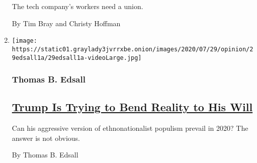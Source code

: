 \begin{enumerate}
  The tech company's workers need a union.

  By Tim Bray and Christy Hoffman
\item
  \texttt{[image: https://static01.graylady3jvrrxbe.onion/images/2020/07/29/opinion/29edsall1a/29edsall1a-videoLarge.jpg]}

  \hypertarget{thomas-b-edsall}{%
  \subsubsection{Thomas B. Edsall}\label{thomas-b-edsall}}

  \hypertarget{trump-is-trying-to-bend-reality-to-his-will}{%
  \subsection{\texorpdfstring{\href{/2020/07/29/opinion/trump-2020-populism.html}{Trump
  Is Trying to Bend Reality to His
  Will}}{Trump Is Trying to Bend Reality to His Will}}\label{trump-is-trying-to-bend-reality-to-his-will}}

  Can his aggressive version of ethnonationalist populism prevail in
  2020? The answer is not obvious.

  By Thomas B. Edsall
\end{enumerate}

